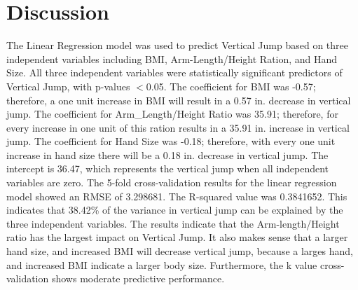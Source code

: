 \documentclass[12pt]{article}
\begin{document}
\section*{Discussion}
The Linear Regression model was used to predict Vertical Jump based on three independent variables including BMI, Arm-Length/Height Ration, and Hand Size. All three independent variables were statistically significant predictors of Vertical Jump, with p-values $<$0.05. The coefficient for BMI was -0.57; therefore, a one unit increase in BMI will result in a 0.57 in. decrease in vertical jump. The coefficient for Arm\_Length/Height Ratio was 35.91; therefore, for every increase in one unit of this ration results in a 35.91 in. increase in vertical jump. The coefficient for Hand Size was -0.18; therefore, with every one unit increase in hand size there will be a 0.18 in. decrease in vertical jump. The intercept is 36.47, which represents the vertical jump when all independent variables are zero. The 5-fold cross-validation results for the linear regression model showed an RMSE of 3.298681. The R-squared value was 0.3841652. This indicates that 38.42\% of the variance in vertical jump can be explained by the three independent variables. The results indicate that the Arm-length/Height ratio has the largest impact on Vertical Jump. It also makes sense that a larger hand size, and increased BMI will decrease vertical jump, because a larges hand, and increased BMI indicate a larger body size. Furthermore, the k value cross-validation shows moderate predictive performance.
\end{document}
